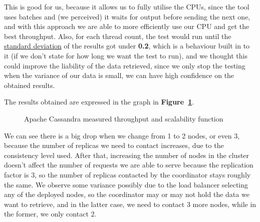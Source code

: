 \documentclass[runningheads]{llncs}
\begin{document}
 This is good for us, because it allows us to fully utilise the CPUs, since the tool uses batches and (we perceived) it waits for output before sending the next one, and with this approach we are able to more efficiently use our CPU and get the best throughput. Also, for each thread count, the test would run until the \underline{standard deviation} of the results got under \textbf{0.2}, which is a behaviour built in to it (if we don't state for how long we want the test to run), and we thought this could improve the liability of the data retrieved, since we only stop the testing when the variance of our data is small, we can have high confidence on the obtained results.\par

The results obtained are expressed in the graph in \textbf{Figure~\ref{Graph:scalability}}.

\begin{figure}
    \begin{center}
    \end{center}
    \caption{Apache Cassandra measured throughput and scalability function}
    \label{Graph:scalability}
\end{figure}

We can see there is a big drop when we change from 1 to 2 nodes, or even 3, because the number of replicas we need to contact increases, due to the consistency level used. After that, increasing the number of nodes in the cluster doesn't affect the number of requests we are able to serve because the replication factor is 3, so the number of replicas contacted by the coordinator stays roughly the same.
We observe some variance possibly due to the load balancer selecting any of the deployed nodes, so the coordinator may or may not hold the data we want to retrieve, and in the latter case, we need to contact 3 more nodes, while in the former, we only contact 2.\par
\end{document}
